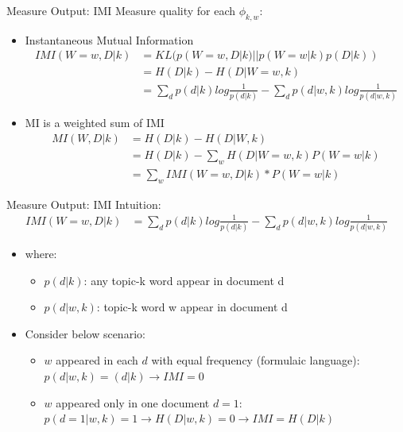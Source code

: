 \documentclass{beamer}
\begin{document}
\begin{frame}{Measure Output: IMI}
Measure quality for each $\phi_{k, w}$: 
\begin{itemize}
\item Instantaneous Mutual Information
\begin{align*}
IMI (W=w, D|k) 
&= KL(p(W=w, D|k) || p(W=w|k)p(D|k))\\
&= H(D|k) - H(D|W=w, k) \\
&= \sum_d p(d|k)log\frac{1}{ p(d|k)} - 
\sum_{d} p(d|w, k)log\frac{1}{ p(d |w, k)}
\end{align*}
\item MI is a weighted sum of IMI
\begin{align*}
MI(W, D|k) &= H(D|k) - H(D|W, k) \\
&= H(D|k) - \sum_w H(D|W=w, k)P(W=w|k)\\
&= \sum_w IMI (W=w, D|k) * P(W=w|k)
\end{align*}
\end{itemize}

\end{frame}

\begin{frame}{Measure Output: IMI}
Intuition:
\begin{align*}
IMI (W=w, D|k) 
&= \sum_d p(d|k)log\frac{1}{ p(d|k)} - 
\sum_{d} p(d|w, k)log\frac{1}{ p(d |w, k)}
\end{align*}
\begin{itemize}[<+->]
\item where:
\begin{itemize}
\item<1-> $p(d |k)$: any topic-k word appear in document d 
\item<1-> $p(d |w, k)$: topic-k word w appear in document d
\end{itemize}
\item Consider below scenario:
\begin{itemize}
\item $w$ appeared in each $d$ with equal frequency (formulaic language):
$p(d|w, k) = (d|k) \rightarrow IMI = 0$
\item $w$ appeared only in one document $d=1$:
$p(d=1|w, k) = 1 \rightarrow H(D|w,k)=0 \rightarrow IMI = H(D|k) $
\end{itemize}

\end{itemize}

\end{frame}
\end{document}
